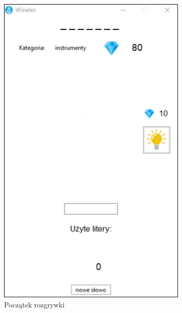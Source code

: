 \documentclass[]{report}
\begin{document}
\begin{figure}[h]
	\centering
	\begin{subfigure}{0.4\textwidth}
		\centering
		\includegraphics[width=\linewidth]{1}
		\caption{Początek rozgrywki}
		\label{fig:rozpoczecie_gry}
		\vspace{0.5cm} %
	\end{subfigure}
	\hspace{1cm} %
	\begin{subfigure}{0.4\textwidth}
		\begin{subfigure}{0.4\textheight}

\end{subfigure}
\end{subfigure}
\end{figure}
\end{document}
